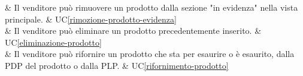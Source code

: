  & Il venditore può rimuovere un prodotto dalla sezione "in evidenza" nella vista principale. & UC\ref{rimozione-prodotto-evidenza} \\
    
 & Il venditore può eliminare un prodotto precedentemente inserito. & UC\ref{eliminazione-prodotto} \\

 & Il venditore può rifornire un prodotto che sta per esaurire o è esaurito, dalla PDP del prodotto o dalla PLP. & UC\ref{rifornimento-prodotto} \\

